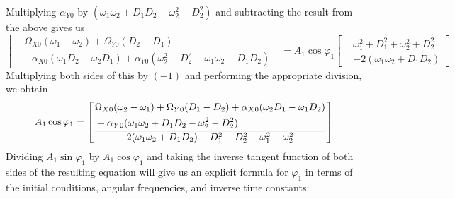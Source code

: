 Multiplying $\alpha_{Y0}$ by
$(\omega_1\omega_2 + D_1 D_2 - \omega_2^2 - D_2^2)$ and subtracting the
result from the above gives us
\begin{equation*}
\left[\begin{aligned}
&\Omega_{X0}(\omega_1 - \omega_2) + \Omega_{Y0}(D_2 - D_1)\\
&+ \alpha_{X0}(\omega_1 D_2 - \omega_2 D_1)
  + \alpha_{Y0}(\omega_2^2 + D_2^2 - \omega_1\omega_2 - D_1 D_2)
\end{aligned}\right]
= A_1\cos\varphi_1\left[\begin{aligned}
&\omega_1^2 + D_1^2 + \omega_2^2 + D_2^2\\
&- 2(\omega_1\omega_2 + D_1 D_2)
\end{aligned}\right]
\end{equation*}
Multiplying both sides of this by $(-1)$ and performing the appropriate
division, we obtain
\begin{equation*}
A_1\cos\varphi_1 = \left[\vcenter{\hbox{$\displaystyle\frac{\begin{aligned}
&\Omega_{X0}(\omega_2 - \omega_1) + \Omega_{Y0}(D_1 - D_2)
  + \alpha_{X0}(\omega_2 D_1 - \omega_1 D_2)\\
&+ \alpha_{Y0}(\omega_1\omega_2 + D_1 D_2 - \omega_2^2 - D_2^2)
\end{aligned}}{2(\omega_1\omega_2 + D_1 D_2) - D_1^2 - D_2^2
  - \omega_1^2 - \omega_2^2}$}}\right]
\end{equation*}
Dividing $A_1\sin\varphi_1$ by $A_1\cos\varphi_1$ and taking the inverse
tangent function of both sides of the resulting equation will give us an
explicit formula for $\varphi_1$ in terms of the initial conditions, angular
frequencies, and inverse time constants:
